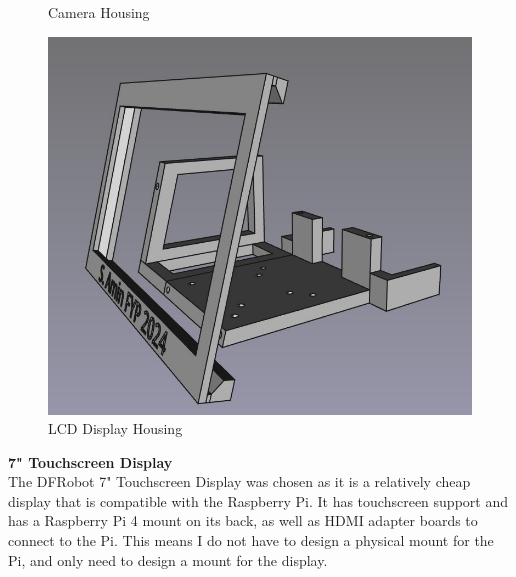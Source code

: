 \begin{figure}
\begin{minipage}[t]{0.32\textwidth}
      \caption{Camera Housing}
      \label{fig:camerahousing}
    \end{minipage}
    \hfill
    \begin{minipage}[t]{0.32\textwidth}
      \centering
      \includegraphics[width=\textwidth]{imgs/freecad/lcd_mount.jpg}
      \caption{LCD Display Housing}
    \end{minipage}
\end{figure}

\vspace{1em}
\noindent
\textbf{7" Touchscreen Display} \\
The DFRobot 7" Touchscreen Display was chosen as it is a relatively cheap display that is compatible with the Raspberry Pi.
It has touchscreen support and has a Raspberry Pi 4 mount on its back, as well as HDMI adapter boards to connect to the Pi.
This means I do not have to design a physical mount for the Pi, and only need to design a mount for the display.

